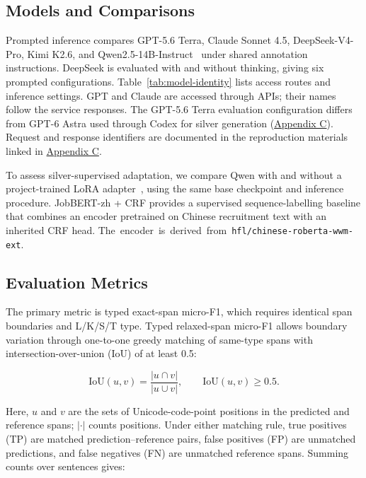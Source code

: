 \subsection{Models and Comparisons}

Prompted inference compares GPT-5.6 Terra, Claude Sonnet 4.5, DeepSeek-V4-Pro, Kimi K2.6, and Qwen2.5-14B-Instruct~\citep{qwen2025report} under shared annotation instructions. DeepSeek is evaluated with and without thinking, giving six prompted configurations. Table~\ref{tab:model-identity} lists access routes and inference settings. GPT and Claude are accessed through APIs; their names follow the service responses. The GPT-5.6 Terra evaluation configuration differs from GPT-6 Astra used through Codex for silver generation (\hyperref[tab:annotation-models]{Appendix C}). Request and response identifiers are documented in the reproduction materials linked in \hyperref[app:c]{Appendix C}.

To assess silver-supervised adaptation, we compare Qwen with and without a project-trained LoRA adapter~\citep{hu2022lora}, using the same base checkpoint and inference procedure. JobBERT-zh + CRF provides a supervised sequence-labelling baseline that combines an encoder pretrained on Chinese recruitment text with an inherited CRF head. \mbox{The encoder is derived from \texttt{hfl/chinese-roberta-wwm-ext}.}







\subsection{Evaluation Metrics}

The primary metric is typed exact-span micro-F1, which requires identical span boundaries and L/K/S/T type. Typed relaxed-span micro-F1 allows boundary variation through one-to-one greedy matching of same-type spans with intersection-over-union (IoU) of at least 0.5:

\begin{equation}
\mathrm{IoU}(u,v)=\frac{|u\cap v|}{|u\cup v|},
\qquad \mathrm{IoU}(u,v)\geq 0.5.
\label{eq:span-iou}
\end{equation}

Here, $u$ and $v$ are the sets of Unicode-code-point positions in the predicted and reference spans; $\lvert\cdot\rvert$ counts positions. Under either matching rule, true positives (TP) are matched prediction--reference pairs, false positives (FP) are unmatched predictions, and false negatives (FN) are unmatched reference spans. Summing counts over sentences gives:


